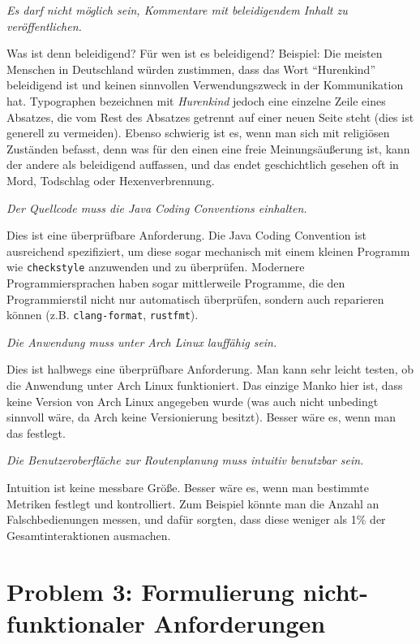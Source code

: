 \documentclass[
  ngerman,
  DIV=14
]{scrartcl}
\begin{document}
\medskip\noindent
\emph{Es darf nicht möglich sein, Kommentare mit beleidigendem Inhalt zu veröffentlichen.}

\medskip\noindent
Was ist denn beleidigend? Für wen ist es beleidigend? Beispiel: Die meisten Menschen in Deutschland würden zustimmen, dass das Wort \enquote{Hurenkind} beleidigend ist und keinen sinnvollen Verwendungszweck in der Kommunikation hat. Typographen bezeichnen mit \emph{Hurenkind} jedoch eine einzelne Zeile eines Absatzes, die vom Rest des Absatzes getrennt auf einer neuen Seite steht (dies ist generell zu vermeiden). Ebenso schwierig ist es, wenn man sich mit religiösen Zuständen befasst, denn was für den einen eine freie Meinungsäußerung ist, kann der andere als beleidigend auffassen, und das endet geschichtlich gesehen oft in Mord, Todschlag oder Hexenverbrennung.

\bigskip\noindent
\emph{Der Quellcode muss die Java Coding Conventions einhalten.}

\medskip\noindent
Dies ist eine überprüfbare Anforderung. Die Java Coding Convention ist ausreichend spezifiziert, um diese sogar mechanisch mit einem kleinen Programm wie \texttt{checkstyle} anzuwenden und zu überprüfen. Modernere Programmiersprachen haben sogar mittlerweile Programme, die den Programmierstil nicht nur automatisch überprüfen, sondern auch reparieren können (z.B. \texttt{clang-for\-mat}, \texttt{rustfmt}).

\bigskip\noindent
\emph{Die Anwendung muss unter Arch Linux lauffähig sein.}

\medskip\noindent
Dies ist halbwegs eine überprüfbare Anforderung. Man kann sehr leicht testen, ob die Anwendung unter Arch Linux funktioniert. Das einzige Manko hier ist, dass keine Version von Arch Linux angegeben wurde (was auch nicht unbedingt sinnvoll wäre, da Arch keine Versionierung besitzt). Besser wäre es, wenn man das festlegt.

\bigskip\noindent
\emph{Die Benutzeroberfläche zur Routenplanung muss intuitiv benutzbar sein.}

\medskip\noindent
Intuition ist keine messbare Größe. Besser wäre es, wenn man bestimmte Metriken festlegt und kontrolliert. Zum Beispiel könnte man die Anzahl an Falschbedienungen messen, und dafür sorgten, dass diese weniger als 1\% der Gesamtinteraktionen ausmachen.

\section*{Problem 3: Formulierung nicht-funktionaler Anforderungen}
\end{document}
